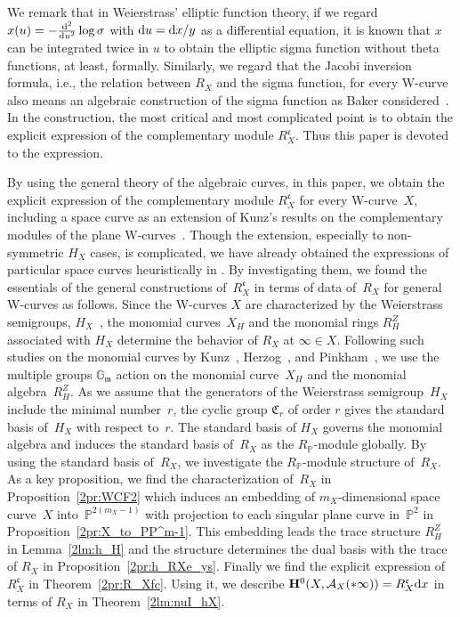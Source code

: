 \documentclass[10pt,a4paper]{amsart}
\def\GG{{\mathbb G}}
\def\PP{{\mathbb P}}
\def\bH{{\mathbf F}}
\def\bH{{\mathbf H}}
\def\cA{{\mathcal A}}
\def\fC{{\mathfrak C}}
\def\fc{{\mathfrak c}}
\def\fm{{\mathfrak m}}
\numberwithin{equation}{section}
\begin{document}
We remark that in Weierstrass' elliptic function theory, if we regard $x(u)=-\frac{{\rm d}^2}{{\rm d} u^2}\log \sigma$ with ${\rm d}u = {\rm d}x/y$ as a differential equation, it is known that $x$ can be integrated twice in $u$ to obtain the elliptic sigma function without theta functions, at least, formally.
Similarly, we regard that the Jacobi inversion formula, i.e., the relation between $R_X$ and the sigma function, for every W-curve also means an algebraic construction of the sigma function as Baker considered~\cite{Baker97}.
In the construction, the most critical and most complicated point is to obtain the explicit expression of the complementary module $R_X^\fc$.
Thus this paper is devoted to the expression.

By using the general theory of the algebraic curves, in this paper, we obtain the explicit expression of the complementary module $R_X^\fc$ for every W-curve~$X$, including a space curve as an extension of Kunz's results on the complementary modules of the plane W-curves~\cite{Kunz2004}.
Though the extension, especially to non-symmetric $H_X$ cases, is complicated, we have already obtained the expressions of particular space curves heuristically in \cite{KMP13, KMP19, MK13}.
By investigating them, we found the essentials of the general constructions of~$R_X^\fc$ in terms of data of~$R_X$ for general W-curves as follows.
Since the W-curves $X$ are characterized by the Weierstrass semigroups, $H_X$~\cite{Wei67}, the monomial curves~$X_H$ and the monomial rings $R_H^Z$ associated with $H_X$ determine the behavior of $R_X$ at $\infty\in X$.
Following such studies on the monomial curves by Kunz~\cite{Kunz1970}, Herzog~\cite{Herzog70}, and Pinkham~\cite{Pinkham74}, we use the multiple groups $\GG_\fm$ action on the monomial curve~$X_H$ and the monomial algebra~$R_H^Z$.
As we assume that the generators of the Weierstrass semigroup~$H_X$ include the minimal number~$r$, the cyclic group $\fC_r$ of order $r$ gives the standard basis of~$H_X$ with respect to~$r$.
The standard basis of $H_X$ governs the monomial algebra and induces the standard basis of~$R_X$ as the $R_\PP$-module globally.
By using the standard basis of~$R_X$, we investigate the $R_\PP$-module structure of~$R_X$.
As a key proposition, we find the characterization of~$R_X$ in Proposition~\ref{2pr:WCF2} which induces an embedding of $m_X$-dimensional space curve~$X$ into~$\PP^{2(m_X-1)}$ with projection to each singular plane curve in~$\PP^2$ in Proposition~\ref{2pr:X_to_PP^m-1}. This embedding leads the trace structure $R_H^Z$ in Lemma~\ref{2lm:h_H} and the structure determines the dual basis with the trace of $R_X$ in Proposition~\ref{2pr:h_RXe_ys}.
Finally we find the explicit expression of~$R_X^\fc$ in Theorem~\ref{2pr:R_Xfc}.
Using it, we describe $\bH^0(X, \cA_X(*\infty))=R_X^\fc {\rm d} x$ in terms of $R_X$ in Theorem~\ref{2lm:nuI_hX}.
\end{document}

